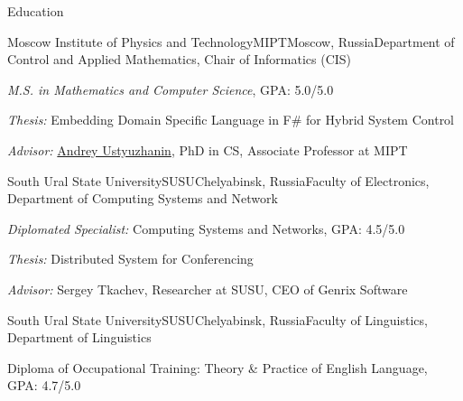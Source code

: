 \documentclass{resume} %
\begin{document}

\begin{rSection}{Education}

\begin{comment}

\begin{rSubsectionEducation}{Keldysh Institute of Applied Mathematics}{KIAM}{Moscow,
Russia}{Program Analysis and Transformation Group}
\item Theoretical Computer Science (2nd year PhD-dropout)
\end{rSubsectionEducation}

\end{comment}


\begin{rSubsectionEducation}{Moscow Institute of Physics and Technology}{MIPT}{Moscow, Russia}{Department of Control and Applied Mathematics, Chair of Informatics (CIS)}
\item \textit{M.S. in Mathematics and Computer Science}, GPA: 5.0/5.0
\item \textit{Thesis:} Embedding Domain Specific Language in F\# for Hybrid System Control
\item \textit{Advisor:} \href{https://ru.linkedin.com/in/andreyustyuzhanin}{Andrey Ustyuzhanin}, 
PhD in CS, Associate Professor at MIPT
\end{rSubsectionEducation}


\begin{rSubsectionEducation}{South Ural State University}{SUSU}{Chelyabinsk, Russia}{Faculty of
Electronics, Department of Computing Systems and Network}
\item \textit{Diplomated Specialist:} Computing Systems and Networks, GPA: 4.5/5.0
\item \textit{Thesis:} Distributed System for Conferencing
\item \textit{Advisor:} Sergey Tkachev, Researcher at SUSU, CEO of Genrix Software
\end{rSubsectionEducation}


\begin{rSubsectionEducation}{South Ural State University}{SUSU}{Chelyabinsk, Russia}{Faculty of Linguistics, Department of Linguistics}
\item Diploma of Occupational Training: Theory \& Practice of English Language, GPA: 4.7/5.0
\end{rSubsectionEducation}


\end{rSection}
\end{document}
